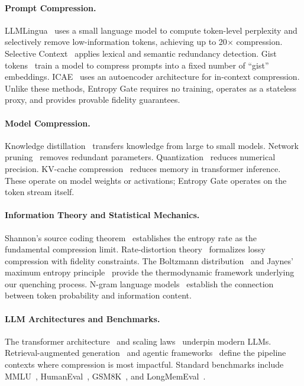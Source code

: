 \documentclass[11pt]{article}
\theoremstyle{remark}
\begin{document}
\paragraph{Prompt Compression.}
LLMLingua~\cite{llmlingua2023} uses a small language model to compute token-level
perplexity and selectively remove low-information tokens, achieving up to 20$\times$
compression. Selective Context~\cite{selective_context2023} applies lexical
and semantic redundancy detection. Gist tokens~\cite{gist2023} train a model
to compress prompts into a fixed number of ``gist'' embeddings. ICAE~\cite{icae2024}
uses an autoencoder architecture for in-context compression. Unlike these
methods, Entropy Gate requires no training, operates as a stateless proxy,
and provides provable fidelity guarantees.

\paragraph{Model Compression.}
Knowledge distillation~\cite{hinton2015} transfers knowledge from large to small
models. Network pruning~\cite{han2015,blalock2020} removes redundant parameters.
Quantization~\cite{dettmers2022, frantar2022} reduces numerical precision.
KV-cache compression~\cite{ge2024kv,h2o2023} reduces memory in transformer
inference. These operate on model weights or activations; Entropy Gate operates
on the token stream itself.

\paragraph{Information Theory and Statistical Mechanics.}
Shannon's source coding theorem~\cite{shannon1948} establishes the entropy rate
as the fundamental compression limit. Rate-distortion theory~\cite{cover2006}
formalizes lossy compression with fidelity constraints. The Boltzmann
distribution~\cite{boltzmann1872} and Jaynes' maximum entropy
principle~\cite{jaynes1957} provide the thermodynamic framework underlying our
quenching process. N-gram language models~\cite{jurafsky2009} establish the
connection between token probability and information content.

\paragraph{LLM Architectures and Benchmarks.}
The transformer architecture~\cite{vaswani2017} and scaling
laws~\cite{kaplan2020,hoffmann2022} underpin modern LLMs. Retrieval-augmented
generation~\cite{lewis2020} and agentic frameworks~\cite{react2022,swetobench2024}
define the pipeline contexts where compression is most impactful. Standard
benchmarks include MMLU~\cite{hendrycks2021}, HumanEval~\cite{chen2021},
GSM8K~\cite{cobbe2021}, and LongMemEval~\cite{longmemeval2025}.
\end{document}
